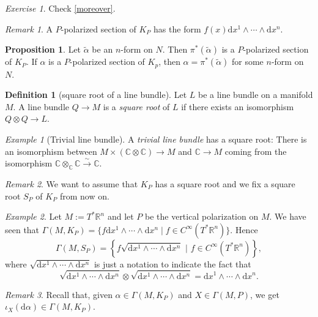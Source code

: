 \documentclass[11pt]{amsart}
\numberwithin{equation}{section}
\theoremstyle{plain}
\theoremstyle{definition}
\newtheorem{defn}{Definition}[subsection]
\newtheorem{prop}{Proposition}[subsection]
\theoremstyle{remark}
\newtheorem{rem}{Remark}[subsection]
\newtheorem{exe}{Exercise}[subsection]
\newtheorem{ex}{Example}[subsection]
\newcommand{\R}{\mathbb{R}}
\newcommand{\dd}{{\mathrm{d}}}
\begin{document}
\begin{exe}
Check \eqref{moreover}.
\end{exe}

\begin{rem}
A $P$-polarized section of $K_P$ has the form $f(x)\dd x^1\land\dotsm\land \dd x^n$.
\end{rem}

\begin{prop}
Let $\tilde{\alpha}$ be an $n$-form on $N$. Then $\pi^*(\tilde{\alpha})$ is a $P$-polarized section of $K_P$. If $\alpha$ is a $P$-polarized section of $K_p$, then $\alpha=\pi^*(\tilde{\alpha})$ for some $n$-form on $N$.
\end{prop}

\begin{defn}[square root of a line bundle]
Let $L$ be a line bundle on a manifold $M$. A line bundle $Q\to M$ is a \emph{square root} of $L$ if there exists an isomorphism $Q\otimes Q\to L$. 
\end{defn}

\begin{ex}[Trivial line bundle]
A \emph{trivial line bundle} has a square root: There is an isomorphism between $M\times (\mathbb{C}\otimes \mathbb{C})\to M$ and $\mathbb{C}\to M$ coming from the isomorphism $\mathbb{C}\otimes_\mathbb{C}\mathbb{C}\xrightarrow{\sim} \mathbb{C}$.
\end{ex}

\begin{rem}
We want to assume that $K_P$ has a square root and we fix a square root $S_P$ of $K_P$ from now on.
\end{rem}

\begin{ex}
Let $M:=T^*\R^n$ and let $P$ be the vertical polarization on $M$. We have seen that $\Gamma(M,K_P)=\{f\dd x^1\land\dotsm \land \dd x^n\mid f\in C^\infty(T^*\R^n)\}$. Hence 
$$\Gamma(M,S_P)=\left\{f\sqrt{\dd x^1\land\dotsm \land\dd x^n}\,\,\big|\,\, f\in C^\infty(T^*\R^n)\right\},$$
where $\sqrt{\dd x^1\land \dotsm \land \dd x^n}$ is just a notation to indicate the fact that 
$$\sqrt{\dd x^1\land \dotsm \land \dd x^n}\otimes\sqrt{\dd x^1\land \dotsm \land \dd x^n}=\dd x^1\land\dotsm \land\dd x^n.$$
\end{ex}

\begin{rem}
\label{rem_form}
Recall that, given $\alpha\in\Gamma(M,K_P)$ and $X\in\Gamma(M,P)$, we get $\iota_X(\dd\alpha)\in\Gamma(M,K_P)$.
\end{rem}
\end{document}

